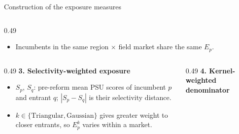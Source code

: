 \documentclass{beamer}
\begin{document}
\begin{frame}{Construction of the exposure measures}
\begin{columns}[T,onlytextwidth]
\begin{column}{0.49\textwidth}
\begin{itemize}
\item Incumbents in the same region $\times$ field market share the
same $E_p$.

\end{itemize}
\end{column}

\end{columns}

\vspace{0.35cm}

\begin{columns}[T,onlytextwidth]

\begin{column}{0.49\textwidth}
\textbf{3. Selectivity-weighted exposure}

\begin{center}
\end{center}

\vspace{-0.1cm}

\begin{itemize}
\tiny
\setlength{\itemsep}{0pt}

\item $S_p$, $S_q$: pre-reform mean PSU scores of incumbent $p$ and
entrant $q$; $|S_p-S_q|$ is their selectivity distance.

\item $k\in\{\mathrm{Triangular},\mathrm{Gaussian}\}$ gives greater weight
to closer entrants, so $E_p^k$ varies within a market.

\end{itemize}
\end{column}

\begin{column}{0.49\textwidth}
\textbf{4. Kernel-weighted denominator}

\begin{center}
\end{center}


\end{column}
\end{columns}
\end{frame}
\end{document}

